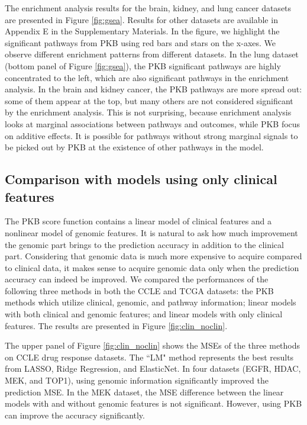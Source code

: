 \documentclass[a4paper,12pt]{article}
\begin{document}
The enrichment analysis results for the brain, kidney, and lung cancer datasets are presented in Figure \ref{fig:gsea}. Results for other datasets are available in Appendix E in the Supplementary Materials. In the figure, we highlight the significant pathways from PKB using red bars and stars on the x-axes. We observe different enrichment patterns from different datasets. In the lung dataset (bottom panel of Figure \ref{fig:gsea}), the PKB significant pathways are highly concentrated to the left, which are also significant pathways in the enrichment analysis. In the brain and kidney cancer, the PKB pathways are more spread out: some of them appear at the top, but many others are not considered significant by the enrichment analysis. This is not surprising, because enrichment analysis looks at marginal associations between pathways and outcomes, while PKB focus on additive effects. It is possible for pathways without strong marginal signals to be picked out by PKB at the existence of other pathways in the model.


\subsection{Comparison with models using only clinical features}

The PKB score function contains a linear model of clinical features and a nonlinear model of genomic features. It is natural to ask how much improvement the genomic part brings to the prediction accuracy in addition to the clinical part. Considering that genomic data is much more expensive to acquire compared to clinical data, it makes sense to acquire genomic data only when the prediction accuracy can indeed be improved. We compared the performances of the following three methods in both the CCLE and TCGA datasets: the PKB methods which utilize clinical, genomic, and pathway information; linear models with both clinical and genomic features; and linear models with only clinical features. The results are presented in Figure \ref{fig:clin_noclin}. 

The upper panel of Figure \ref{fig:clin_noclin} shows the MSEs of the three methods on CCLE drug response datasets. The ``LM" method represents the best results from LASSO, Ridge Regression, and ElasticNet. In four datasets (EGFR, HDAC, MEK, and TOP1), using genomic information significantly improved the prediction MSE. In the MEK dataset, the MSE difference between the linear models with and without genomic features is not significant. However, using PKB can improve the accuracy significantly.
\end{document}
